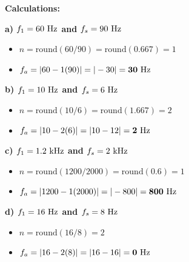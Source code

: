 \documentclass[11pt]{article}
\begin{document}
\textbf{Calculations:}

\textbf{a) $f_1 = 60 \text{ \si{\hertz}}$ and $f_s = 90 \text{ \si{\hertz}}$}
\begin{itemize}
\item $n = \text{round}(60 / 90) = \text{round}(0.667) = 1$
\item $f_a = |60 - 1(90)| = |-30| = \mathbf{30 \text{ \si{\hertz}}}$
\end{itemize}

\textbf{b) $f_1 = 10 \text{ \si{\hertz}}$ and $f_s = 6 \text{ \si{\hertz}}$}
\begin{itemize}
\item $n = \text{round}(10 / 6) = \text{round}(1.667) = 2$
\item $f_a = |10 - 2(6)| = |10 - 12| = \mathbf{2 \text{ \si{\hertz}}}$
\end{itemize}

\textbf{c) $f_1 = 1.2 \text{ \si{\kilo\hertz}}$ and $f_s = 2 \text{ \si{\kilo\hertz}}$}
\begin{itemize}
\item $n = \text{round}(1200 / 2000) = \text{round}(0.6) = 1$
\item $f_a = |1200 - 1(2000)| = |-800| = \mathbf{800 \text{ \si{\hertz}}}$
\end{itemize}

\textbf{d) $f_1 = 16 \text{ \si{\hertz}}$ and $f_s = 8 \text{ \si{\hertz}}$}
\begin{itemize}
\item $n = \text{round}(16 / 8) = 2$
\item $f_a = |16 - 2(8)| = |16 - 16| = \mathbf{0 \text{ \si{\hertz}}}$
\end{itemize}
\end{document}

